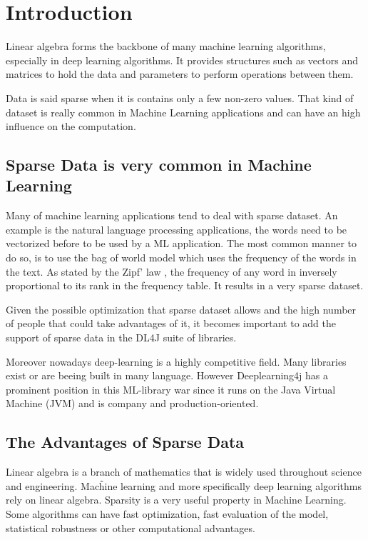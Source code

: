 \chapter{Introduction}


Linear algebra forms the backbone of many machine learning algorithms, especially in deep learning algorithms. It provides structures such as vectors and matrices to hold the data and parameters to perform operations between them. 

Data is said sparse when it is contains only a few non-zero values. That kind of dataset is really common in Machine Learning applications and can have an high influence on the computation. 

\section{Sparse Data is very common in Machine Learning}

Many of machine learning applications tend to deal with sparse dataset. An example is the natural language processing applications, the words need to be vectorized before to be used by a ML application. The most common manner to do so, is to use the bag of world model which uses the frequency of the words in the text. As stated by the Zipf' law \cite{Zipf}, the frequency of any word in inversely proportional to its rank in the frequency table. It results in a very sparse dataset.

Given the possible optimization that sparse dataset allows and the high number of people that could take advantages of it, it becomes important to add the support of sparse data in the DL4J suite of libraries. 

Moreover nowadays deep-learning is a highly competitive field. Many libraries exist or are beeing built in many language. However Deeplearning4j has a prominent position in this ML-library war since it runs on the Java Virtual Machine (JVM) and is company and production-oriented.



\section{The Advantages of Sparse Data}
Linear algebra is a branch of mathematics that is widely used throughout science and engineering. Macĥine learning and more specifically deep learning algorithms rely on linear algebra. Sparsity is a very useful property in Machine Learning. Some algorithms can have fast optimization, fast evaluation of the model, statistical robustness or other computational advantages.


